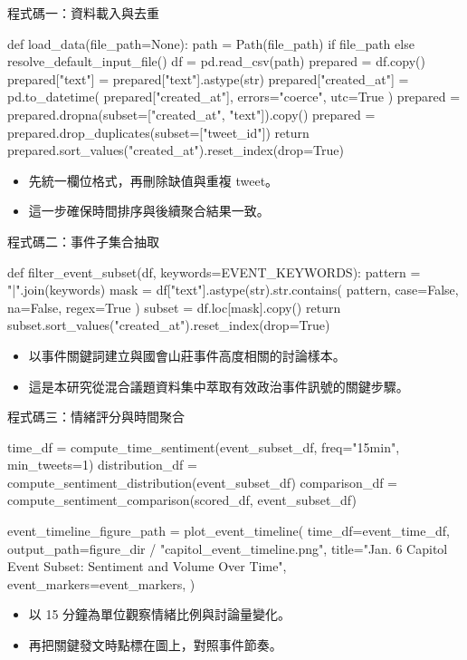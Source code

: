\documentclass[aspectratio=169]{ctexbeamer}
\begin{document}
\begin{frame}[fragile]{程式碼一：資料載入與去重}
\begin{CodeBlock}
def load_data(file_path=None):
    path = Path(file_path) if file_path else resolve_default_input_file()
    df = pd.read_csv(path)
    prepared = df.copy()
    prepared["text"] = prepared["text"].astype(str)
    prepared["created_at"] = pd.to_datetime(
        prepared["created_at"], errors="coerce", utc=True
    )
    prepared = prepared.dropna(subset=["created_at", "text"]).copy()
    prepared = prepared.drop_duplicates(subset=["tweet_id"])
    return prepared.sort_values("created_at").reset_index(drop=True)
\end{CodeBlock}

\begin{itemize}
  \item 先統一欄位格式，再刪除缺值與重複 tweet。
  \item 這一步確保時間排序與後續聚合結果一致。
\end{itemize}
\end{frame}

\begin{frame}[fragile]{程式碼二：事件子集合抽取}
\begin{CodeBlock}
def filter_event_subset(df, keywords=EVENT_KEYWORDS):
    pattern = "|".join(keywords)
    mask = df["text"].astype(str).str.contains(
        pattern, case=False, na=False, regex=True
    )
    subset = df.loc[mask].copy()
    return subset.sort_values("created_at").reset_index(drop=True)
\end{CodeBlock}

\begin{itemize}
  \item 以事件關鍵詞建立與國會山莊事件高度相關的討論樣本。
  \item 這是本研究從混合議題資料集中萃取有效政治事件訊號的關鍵步驟。
\end{itemize}
\end{frame}

\begin{frame}[fragile]{程式碼三：情緒評分與時間聚合}
\begin{CodeBlock}
time_df = compute_time_sentiment(event_subset_df, freq="15min", min_tweets=1)
distribution_df = compute_sentiment_distribution(event_subset_df)
comparison_df = compute_sentiment_comparison(scored_df, event_subset_df)

event_timeline_figure_path = plot_event_timeline(
    time_df=event_time_df,
    output_path=figure_dir / "capitol_event_timeline.png",
    title="Jan. 6 Capitol Event Subset: Sentiment and Volume Over Time",
    event_markers=event_markers,
)
\end{CodeBlock}

\begin{itemize}
  \item 以 15 分鐘為單位觀察情緒比例與討論量變化。
  \item 再把關鍵發文時點標在圖上，對照事件節奏。
\end{itemize}
\end{frame}
\end{document}
